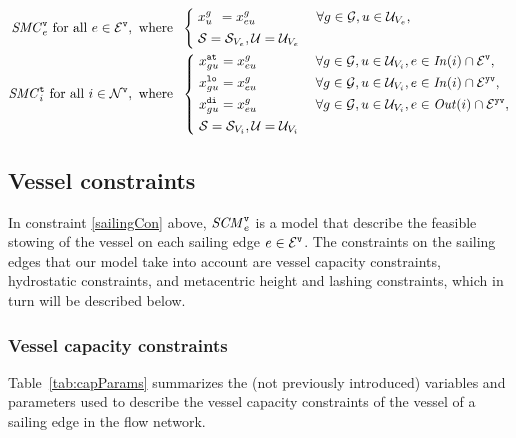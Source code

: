 \begin{alignat}{3}
\label{sailingCon}
\mi{SMC}^\ttt{v}_e \text{ for all } e\in \mc{E}^\ttt{v}, \text{ where }\;
			&\left\{\;
			\begin{aligned}
					&x^g_{u\phantom{g}} = x^g_{eu} & \;\forall g\in\mc{G}, u\in \mc{U}_{V_e},\\
					&\mc{S} = \mc{S}_{V_e}, \mc{U} = \mc{U}_{V_e} 
			\end{aligned}\right.\\
%
\label{terminalCon}
\mi{SMC}^\ttt{t}_i \text{ for all } i\in\mc{N}^\ttt{v}, \text{ where } \;
			&\left\{\;
			\begin{aligned}
					&x^\ttt{at}_{gu} = x^g_{eu} && \;\forall g\in\mc{G}, u\in \mc{U}_{V_i}, e\in \mi{In}(i)\cap\mc{E}^\ttt{v},\\
					&x^\ttt{lo}_{gu} = x^g_{eu} && \;\forall g\in\mc{G}, u\in \mc{U}_{V_i}, e\in \mi{In}(i)\cap\mc{E}^\ttt{yv},\\
					&x^\ttt{di}_{gu} = x^g_{eu} && \;\forall g\in\mc{G}, u\in \mc{U}_{V_i}, e\in \mi{Out}(i)\cap\mc{E}^\ttt{yv},\\
					&\mc{S} = \mc{S}_{V_i}, \mc{U} = \mc{U}_{V_i} 
			\end{aligned}\right.
\end{alignat}



\subsection{Vessel constraints}
In constraint \eqref{sailingCon} above, $\mathit{SCM}^\texttt{v}_{e}$ is a model that describe the feasible stowing of the vessel on each sailing edge $e\in \mathcal{E}^\texttt{v}$.  
The constraints on the sailing edges that our model take into account are vessel capacity constraints, hydrostatic constraints, and metacentric height and lashing constraints, which in turn will be described below. 
 
\subsubsection{Vessel capacity constraints}
Table~\ref{tab:capParams} summarizes the (not previously introduced) variables and parameters used to describe the vessel capacity constraints of the vessel of a sailing edge in the flow network.

